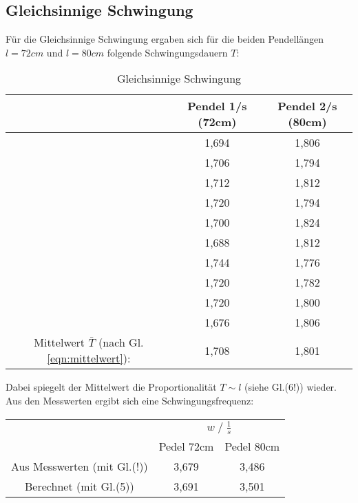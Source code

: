 \subsection{Gleichsinnige Schwingung}
Für die Gleichsinnige Schwingung ergaben sich für die beiden Pendellängen $l=72cm$ und $l=80cm$
folgende Schwingungsdauern $T$:
\begin{table}
    \centering
    \label{tab:Data_gleichphasig}
    \begin{tabular}{c c | c}
        \toprule
        & Pendel 1\;/\;s (72cm) & Pendel 2\;/\;s (80cm)\\
        \midrule
            & 1,694 & 1,806 \\
            & 1,706 & 1,794 \\
            & 1,712 & 1,812 \\
            & 1,720 & 1,794 \\
            & 1,700 & 1,824 \\
            & 1,688 & 1,812 \\
            & 1,744 & 1,776 \\
            & 1,720 & 1,782 \\
            & 1,720 & 1,800 \\
            & 1,676 & 1,806 \\        
        \midrule
        Mittelwert $\bar{T}$ (nach Gl. \ref{eqn:mittelwert}): & 1,708 & 1,801 \\
        \bottomrule
    \end{tabular}
    \caption{Gleichsinnige Schwingung}
\end{table}

Dabei spiegelt der Mittelwert die Proportionalität $T \sim l$ (siehe Gl.(6!)) wieder.\newline
Aus den Messwerten ergibt sich eine Schwingungsfrequenz:
\begin{table}
    \centering
    \label{tab:frq_gleichs}
    \begin{tabular}{c c c}
        \toprule
        & \multicolumn{2}{c}{$w\;/\;\frac{1}{s}$}\\
        \cmidrule(lr){2-3} 
        & Pedel 72cm & Pedel 80cm\\
        \midrule
        Aus Messwerten (mit Gl.(!)) & 3,679 & 3,486 \\
        Berechnet (mit Gl.(5))      & 3,691 & 3,501 \\
        \bottomrule
    \end{tabular}
\end{table}
\newpage


